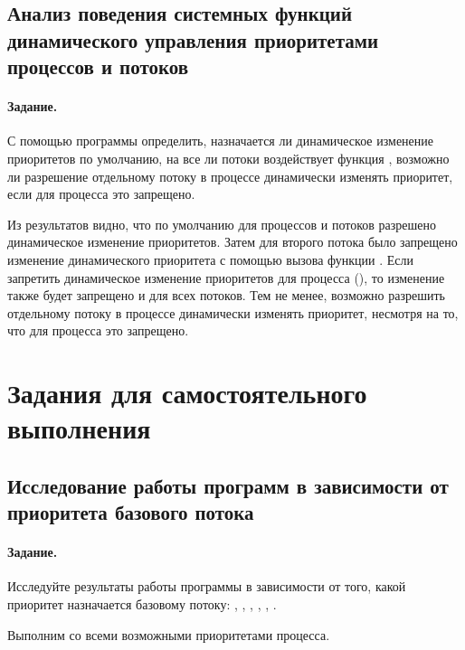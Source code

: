 \subsection{Анализ поведения системных функций динамического управления приоритетами процессов и потоков}

\paragraph{Задание.} С помощью программы определить, назначается ли динамическое изменение приоритетов по умолчанию, на все ли потоки воздействует функция , возможно ли разрешение отдельному потоку в процессе динамически изменять приоритет, если для процесса это запрещено.


Из результатов видно, что по умолчанию для процессов и потоков разрешено динамическое изменение приоритетов. Затем для второго потока было запрещено изменение динамического приоритета с помощью вызова функции . Если запретить динамическое изменение приоритетов для процесса (), то изменение также будет запрещено и для всех потоков. Тем не менее, возможно разрешить отдельному потоку в процессе динамически изменять приоритет, несмотря на то, что для процесса это запрещено.

\newpage

\section{Задания для самостоятельного выполнения}

\subsection{Исследование работы программ в зависимости от приоритета базового потока}

\paragraph{Задание.} Исследуйте результаты работы программы  в зависимости от того, какой приоритет назначается базовому потоку: , , , , , .

Выполним  со всеми возможными приоритетами процесса.



